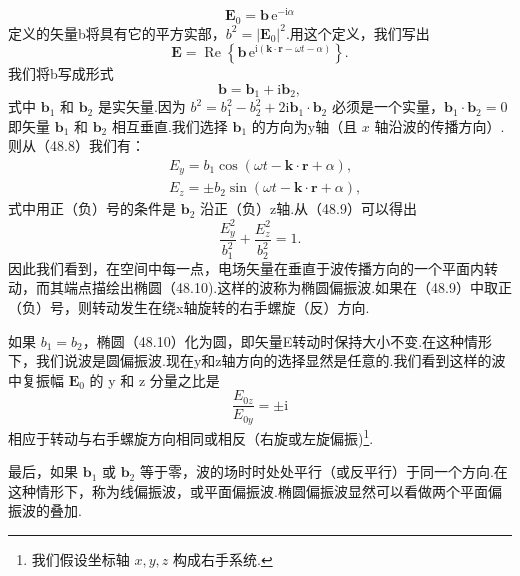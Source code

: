 \begin{equation}
  \boldsymbol{E}_0=\boldsymbol{b}\,\mathrm{e}^{-\mathrm{i}\alpha}
\end{equation}
定义的矢量b将具有它的平方实部，$b^2 = |\boldsymbol{E}_0|^2$.用这个定义，我们写出
\begin{equation}
  \boldsymbol{E}=\operatorname{Re}\left\{\boldsymbol{b}\,
  \mathrm{e}^{\mathrm{i}(\boldsymbol{k}\cdot\boldsymbol{r}-\omega t-\alpha)}\right\}.
\end{equation}
我们将b写成形式
\begin{equation*}
  \boldsymbol{b}=\boldsymbol{b}_1+\mathrm{i}\boldsymbol{b}_2,
\end{equation*}
式中 $\boldsymbol{b}_1$ 和 $\boldsymbol{b}_2$ 是实矢量.因为 $b^2 = b_1^2 - b_2^2 + 2\mathrm{i}\boldsymbol{b}_1\cdot\boldsymbol{b}_2$ 必须是一个实量，$\boldsymbol{b}_1\cdot\boldsymbol{b}_2 = 0$ 即矢量 $\boldsymbol{b}_1$ 和 $\boldsymbol{b}_2$ 相互垂直.我们选择 $\boldsymbol{b}_1$ 的方向为y轴（且 $x$ 轴沿波的传播方向）.则从（48.8）我们有：
\begin{equation}
\begin{aligned}
  &E_y=b_1\cos(\omega t-\boldsymbol{k}\cdot\boldsymbol{r}+\alpha),\\
  &E_z=\pm b_2\sin(\omega t-\boldsymbol{k}\cdot\boldsymbol{r}+\alpha),
\end{aligned}
\end{equation}
式中用正（负）号的条件是 $\boldsymbol{b}_2$ 沿正（负）z轴.从（48.9）可以得出
\begin{equation}
  \frac{E_y^2}{b_1^2}+\frac{E_z^2}{b_2^2}=1.
\end{equation}
因此我们看到，在空间中每一点，电场矢量在垂直于波传播方向的一个平面内转动，而其端点描绘出椭圆（48.10).这样的波称为椭圆偏振波.如果在（48.9）中取正（负）号，则转动发生在绕x轴旋转的右手螺旋（反）方向.

如果 $b_1 = b_2$，椭圆（48.10）化为圆，即矢量E转动时保持大小不变.在这种情形下，我们说波是圆偏振波.现在y和z轴方向的选择显然是任意的.我们看到这样的波中复振幅 $\boldsymbol{E}_0$ 的 y 和 z 分量之比是
\begin{equation}
  \frac{E_{0z}}{E_{0y}}=\pm\mathrm{i}
\end{equation}
相应于转动与右手螺旋方向相同或相反（右旋或左旋偏振)\footnote{我们假设坐标轴 $x,y,z$ 构成右手系统.}.

最后，如果 $\boldsymbol{b}_1$ 或 $\boldsymbol{b}_2$ 等于零，波的场时时处处平行（或反平行）于同一个方向.在这种情形下，称为线偏振波，或平面偏振波.椭圆偏振波显然可以看做两个平面偏振波的叠加.

